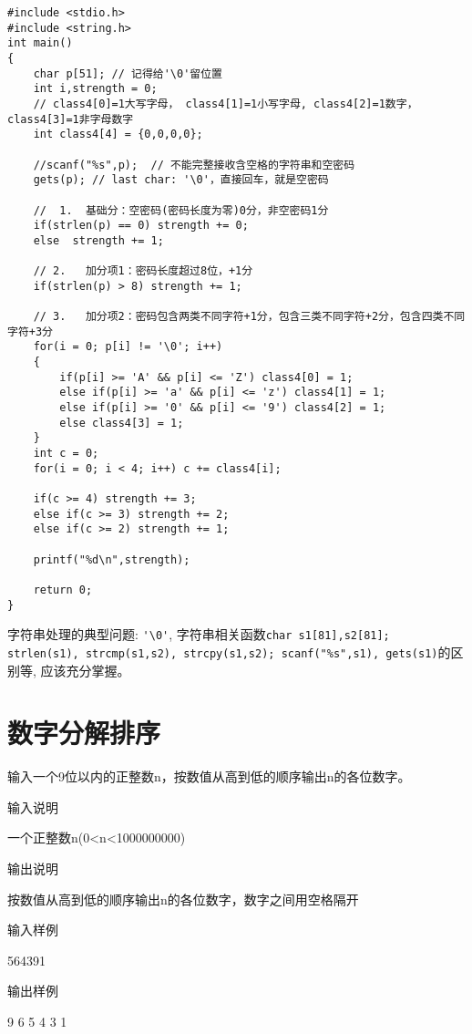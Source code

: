 \begin{lstlisting}	
#include <stdio.h>
#include <string.h>
int main()
{
	char p[51]; // 记得给'\0'留位置
	int i,strength = 0;
	// class4[0]=1大写字母， class4[1]=1小写字母, class4[2]=1数字， class4[3]=1非字母数字 
	int class4[4] = {0,0,0,0};  
	
	//scanf("%s",p);  // 不能完整接收含空格的字符串和空密码 
	gets(p); // last char: '\0'，直接回车，就是空密码 
	
	// 	1.	基础分：空密码(密码长度为零)0分，非空密码1分 
	if(strlen(p) == 0) strength += 0;
	else  strength += 1;
	
	// 2.	加分项1：密码长度超过8位，+1分 
	if(strlen(p) > 8) strength += 1;
	
	// 3.	加分项2：密码包含两类不同字符+1分，包含三类不同字符+2分，包含四类不同字符+3分 
	for(i = 0; p[i] != '\0'; i++)
	{
		if(p[i] >= 'A' && p[i] <= 'Z') class4[0] = 1; 
		else if(p[i] >= 'a' && p[i] <= 'z') class4[1] = 1; 
		else if(p[i] >= '0' && p[i] <= '9') class4[2] = 1;
		else class4[3] = 1; 
	}
	int c = 0;
	for(i = 0; i < 4; i++) c += class4[i];
	
	if(c >= 4) strength += 3;
	else if(c >= 3) strength += 2;
	else if(c >= 2) strength += 1;
	
	printf("%d\n",strength);
	
	return 0;
}
\end{lstlisting}

\begin{note}[要点]
	字符串处理的典型问题: \lstinline|'\0'|, 字符串相关函数\lstinline|char s1[81],s2[81]; strlen(s1), strcmp(s1,s2), strcpy(s1,s2); scanf("%s",s1), gets(s1)|的区别等, 应该充分掌握。
\end{note}



\section{数字分解排序}
输入一个9位以内的正整数n，按数值从高到低的顺序输出n的各位数字。

输入说明	

一个正整数n(0<n<1000000000)

输出说明	

按数值从高到低的顺序输出n的各位数字，数字之间用空格隔开

输入样例	

564391

输出样例

9 6 5 4 3 1

